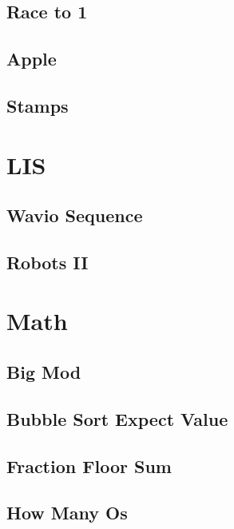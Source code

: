         \subsection{Race to 1}
                
        \subsection{Apple}
                
        \subsection{Stamps}
                

\section{LIS}
        \subsection{Wavio Sequence}
                
        \subsection{Robots II}
                

\section{Math}
        \subsection{Big Mod}
                
        \subsection{Bubble Sort Expect Value}
                
        \subsection{Fraction Floor Sum}
                
        \subsection{How Many Os}
                
